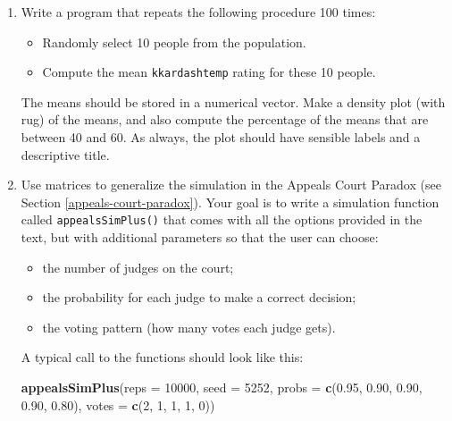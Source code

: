 \documentclass[]{book}
\makeatletter
\newenvironment{Shaded}{\begin{snugshade}}{\end{snugshade}}
\newcommand{\KeywordTok}[1]{\textcolor[rgb]{0.13,0.29,0.53}{\textbf{{#1}}}}
\newcommand{\DataTypeTok}[1]{\textcolor[rgb]{0.13,0.29,0.53}{{#1}}}
\newcommand{\DecValTok}[1]{\textcolor[rgb]{0.00,0.00,0.81}{{#1}}}
\newcommand{\FloatTok}[1]{\textcolor[rgb]{0.00,0.00,0.81}{{#1}}}
\newcommand{\NormalTok}[1]{{#1}}
\providecommand{\tightlist}{%
  \setlength{\itemsep}{0pt}\setlength{\parskip}{0pt}}
\newenvironment{kframe}{%
\medskip{}
\setlength{\fboxsep}{.8em}
 \def\at@end@of@kframe{}%
 \ifinner\ifhmode%
  \def\at@end@of@kframe{\end{minipage}}%
  \begin{minipage}{\columnwidth}%
 \fi\fi%
 \def\FrameCommand##1{\hskip\@totalleftmargin \hskip-\fboxsep
 \colorbox{shadecolor}{##1}\hskip-\fboxsep
     \hskip-\linewidth \hskip-\@totalleftmargin \hskip\columnwidth}%
 \MakeFramed {\advance\hsize-\width
   \@totalleftmargin\z@ \linewidth\hsize
   \@setminipage}}%
 {\par\unskip\endMakeFramed%
 \at@end@of@kframe}
\renewenvironment{Shaded}{\begin{kframe}}{\end{kframe}}
\theoremstyle{definition}
\theoremstyle{definition}
\theoremstyle{remark}
\makeatother
\begin{document}
{\begin{enumerate}
  One of the variables in \texttt{imagpop} is \texttt{kkardashtemp}, the
  rating given by each person to the celebrity Kim Kardashian. Make a
  density plot of the ratings. Compute the mean Kim Kardashian raintg
  for all the people in \texttt{imagpop}. Finally, compute the
  percentage of people in the population who gave a rating more than 40
  but less than 60.
\item
  Write a program that repeats the following procedure 100 times:

  \begin{itemize}
  \tightlist
  \item
    Randomly select 10 people from the population.
  \item
    Compute the mean \texttt{kkardashtemp} rating for these 10 people.
  \end{itemize}

  The means should be stored in a numerical vector. Make a density plot
  (with rug) of the means, and also compute the percentage of the means
  that are between 40 and 60. As always, the plot should have sensible
  labels and a descriptive title.
\item
  Use matrices to generalize the simulation in the Appeals Court Paradox
  (see Section \ref{appeals-court-paradox}). Your goal is to write a
  simulation function called \texttt{appealsSimPlus()} that comes with
  all the options provided in the text, but with additional parameters
  so that the user can choose:

  \begin{itemize}
  \tightlist
  \item
    the number of judges on the court;
  \item
    the probability for each judge to make a correct decision;
  \item
    the voting pattern (how many votes each judge gets).
  \end{itemize}

  A typical call to the functions should look like this:

\begin{Shaded}
\begin{Highlighting}[]
\KeywordTok{appealsSimPlus}\NormalTok{(}\DataTypeTok{reps =} \DecValTok{10000}\NormalTok{, }\DataTypeTok{seed =} \DecValTok{5252}\NormalTok{, }
               \DataTypeTok{probs =} \KeywordTok{c}\NormalTok{(}\FloatTok{0.95}\NormalTok{, }\FloatTok{0.90}\NormalTok{, }\FloatTok{0.90}\NormalTok{, }\FloatTok{0.90}\NormalTok{, }\FloatTok{0.80}\NormalTok{),}
               \DataTypeTok{votes =} \KeywordTok{c}\NormalTok{(}\DecValTok{2}\NormalTok{, }\DecValTok{1}\NormalTok{, }\DecValTok{1}\NormalTok{, }\DecValTok{1}\NormalTok{, }\DecValTok{0}\NormalTok{))}
\end{Highlighting}
\end{Shaded}


\end{enumerate}}
\end{document}
